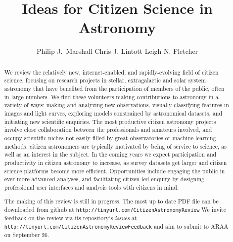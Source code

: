\documentclass{ar2e}
\def\url#1{\texttt{#1}}
\begin{document}

\jvol{}
\ARinfo{}

\title{Ideas for Citizen Science in Astronomy}

\author{%
Philip J.\ Marshall
Chris J. Lintott
Leigh N. Fletcher
}




\begin{abstract} 

We review the relatively new, internet-enabled, and rapidly-evolving field of
citizen science, focusing on research projects in stellar, extragalactic and 
solar system astronomy that have benefited from the participation of members of
the public, often in large numbers. We find these volunteers making
contributions to astronomy in a variety of ways: making and analyzing new
observations, visually classifying features in images and light curves,
exploring models constrained by astronomical datasets, and initiating new
scientific enquiries.  The most productive citizen astronomy projects involve
close collaboration between the professionals and amateurs involved, and occupy
scientific niches not easily filled by great observatories or machine learning
methods: citizen astronomers are typically motivated by being of service to
science, as well as an interest in the subject. In the coming years we expect participation and productivity in citizen
astronomy to increase, as survey datasets get larger and citizen science
platforms become more efficient. Opportunities include engaging the public in
ever more advanced analyses, and facilitating citizen-led enquiry by designing
professional user interfaces and analysis tools with citizens in mind.

\medskip The making of this review is still in progress. The most up to date PDF
file can be downloaded from github at 
\url{http://tinyurl.com/CitizenAstronomyReview} We invite feedback on the review
via its repository's {\it issues} at 
\url{http://tinyurl.com/CitizenAstronomyReviewFeedback} and aim to submit to
ARAA on September 26.

\end{abstract}
\end{document}
